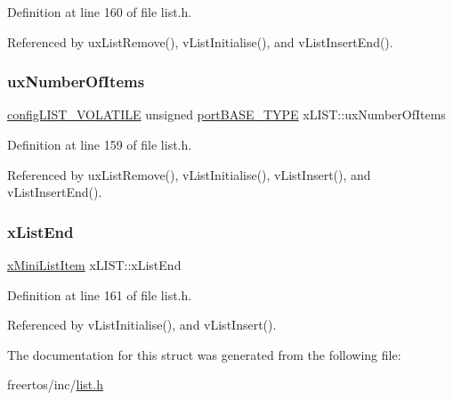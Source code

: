 Definition at line 160 of file list.\+h.



Referenced by ux\+List\+Remove(), v\+List\+Initialise(), and v\+List\+Insert\+End().

\mbox{\label{structxLIST_a268fd44743a3b6d3cd4dd36a72a678fa}} 
\subsubsection{\texorpdfstring{ux\+Number\+Of\+Items}{uxNumberOfItems}}
{\footnotesize\ttfamily \hyperlink{list_8h_a2d5de557c5561c8980d1bf51d87d8cba}{config\+L\+I\+S\+T\+\_\+\+V\+O\+L\+A\+T\+I\+LE} unsigned \hyperlink{portmacro_8h_a1ebe82d24d764ae4e352f7c3a9f92c01}{port\+B\+A\+S\+E\+\_\+\+T\+Y\+PE} x\+L\+I\+S\+T\+::ux\+Number\+Of\+Items}



Definition at line 159 of file list.\+h.



Referenced by ux\+List\+Remove(), v\+List\+Initialise(), v\+List\+Insert(), and v\+List\+Insert\+End().

\mbox{\label{structxLIST_a919ec0b26ba08c9787675b6161f7e318}} 
\subsubsection{\texorpdfstring{x\+List\+End}{xListEnd}}
{\footnotesize\ttfamily \hyperlink{list_8h_a9fb3b8c76f89efd6b8787f66e94ba04c}{x\+Mini\+List\+Item} x\+L\+I\+S\+T\+::x\+List\+End}



Definition at line 161 of file list.\+h.



Referenced by v\+List\+Initialise(), and v\+List\+Insert().



The documentation for this struct was generated from the following file\+:\begin{DoxyCompactItemize}
\item 
freertos/inc/\hyperlink{list_8h}{list.\+h}\end{DoxyCompactItemize}
